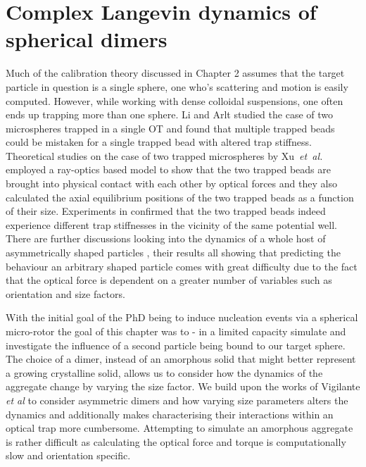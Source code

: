 \chapter{Complex Langevin dynamics of spherical dimers}
\label{chapter:langevin_dynamics}
Much of the calibration theory discussed in Chapter 2 assumes that the
target particle in question is a single sphere, one who's scattering and 
motion is easily computed. However, while working with dense colloidal 
suspensions, one often ends up trapping more than one sphere. Li and 
Arlt \cite{Li2008} studied the case of two microspheres trapped in a single 
OT and found that multiple trapped beads could be mistaken for a single 
trapped bead with altered trap stiffness. Theoretical studies on the case 
of two trapped microspheres by Xu~\textit{et~al.} \cite{Xu2005} employed a 
ray-optics based model to show that the two trapped beads are brought into 
physical contact with each other by optical forces and they also calculated 
the axial equilibrium positions of the two trapped beads as a function of 
their size. Experiments in \cite{Praveen2016} confirmed that the two trapped 
beads indeed experience different trap stiffnesses in the vicinity of the 
same potential well. There are further discussions looking into the dynamics 
of a whole host of asymmetrically shaped particles \cite{Loudet2014, ShengHua2005, 
Chetana2022}, their results all showing that predicting the behaviour an 
arbitrary shaped particle comes with great difficulty due to the fact that 
the optical force is dependent on a greater number of variables such as 
orientation and size factors.

With the initial goal of the PhD being to induce nucleation events via a 
spherical micro-rotor the goal of this chapter was to - in a limited capacity
simulate and investigate the influence of a second particle being bound to our 
target sphere. The choice of a dimer, instead of an amorphous solid that 
might better represent a growing crystalline solid, allows us to consider 
how the dynamics of the aggregate change by varying the size factor. We build 
upon the works of Vigilante \textit{et al} \cite{Vigilante2020} to consider 
asymmetric dimers and how varying size parameters alters the dynamics and 
additionally makes characterising their interactions within an optical trap 
more cumbersome. Attempting to simulate an amorphous aggregate is rather
difficult as calculating the optical force and torque is computationally 
slow and orientation specific. 


